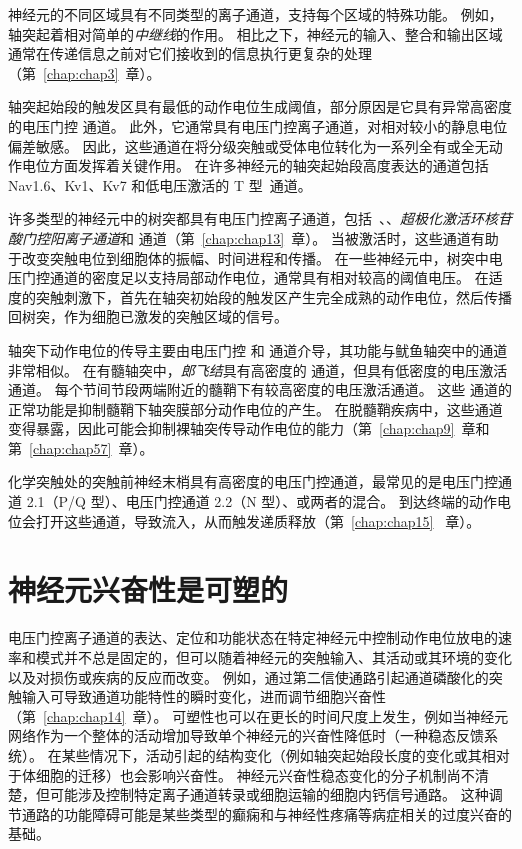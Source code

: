 神经元的不同区域具有不同类型的离子通道，支持每个区域的特殊功能。
例如，轴突起着相对简单的\textit{中继线}的作用。
相比之下，神经元的输入、整合和输出区域通常在传递信息之前对它们接收到的信息执行更复杂的处理（第~\ref{chap:chap3}~章）。


轴突起始段的触发区具有最低的动作电位生成阈值，部分原因是它具有异常高密度的电压门控  通道。
此外，它通常具有电压门控离子通道，对相对较小的静息电位偏差敏感。
因此，这些通道在将分级突触或受体电位转化为一系列全有或全无动作电位方面发挥着关键作用。
在许多神经元的轴突起始段高度表达的通道包括 Nav1.6、Kv1、Kv7 和低电压激活的 T 型~通道。


许多类型的神经元中的树突都具有电压门控离子通道，包括~、、\textit{超极化激活环核苷酸门控阳离子通道}和  通道（第~\ref{chap:chap13}~章）。
当被激活时，这些通道有助于改变突触电位到细胞体的振幅、时间进程和传播。
在一些神经元中，树突中电压门控通道的密度足以支持局部动作电位，通常具有相对较高的阈值电压。
在适度的突触刺激下，首先在轴突初始段的触发区产生完全成熟的动作电位，然后传播回树突，作为细胞已激发的突触区域的信号。


轴突下动作电位的传导主要由电压门控  和  通道介导，其功能与鱿鱼轴突中的通道非常相似。
在有髓轴突中，\textit{郎飞结}具有高密度的  通道，但具有低密度的电压激活  通道。
每个节间节段两端附近的髓鞘下有较高密度的电压激活通道。
这些  通道的正常功能是抑制髓鞘下轴突膜部分动作电位的产生。
在脱髓鞘疾病中，这些通道变得暴露，因此可能会抑制裸轴突传导动作电位的能力（第~\ref{chap:chap9}~章和第~\ref{chap:chap57}~章）。


化学突触处的突触前神经末梢具有高密度的电压门控通道，最常见的是电压门控通道 2.1（P/Q 型）、电压门控通道 2.2（N 型）、或两者的混合。
到达终端的动作电位会打开这些通道，导致流入，从而触发递质释放（第~\ref{chap:chap15} ~章）。



\section{神经元兴奋性是可塑的}

电压门控离子通道的表达、定位和功能状态在特定神经元中控制动作电位放电的速率和模式并不总是固定的，但可以随着神经元的突触输入、其活动或其环境的变化以及对损伤或疾病的反应而改变。
例如，通过第二信使通路引起通道磷酸化的突触输入可导致通道功能特性的瞬时变化，进而调节细胞兴奋性（第~\ref{chap:chap14}~章）。
可塑性也可以在更长的时间尺度上发生，例如当神经元网络作为一个整体的活动增加导致单个神经元的兴奋性降低时（一种稳态反馈系统）。
在某些情况下，活动引起的结构变化（例如轴突起始段长度的变化或其相对于体细胞的迁移）也会影响兴奋性。
神经元兴奋性稳态变化的分子机制尚不清楚，但可能涉及控制特定离子通道转录或细胞运输的细胞内钙信号通路。 
这种调节通路的功能障碍可能是某些类型的癫痫和与神经性疼痛等病症相关的过度兴奋的基础。




